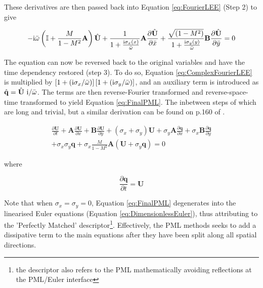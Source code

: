 These derivatives are then passed back into Equation \ref{eq:FourierLEE} (Step 2) to give

\begin{equation} \label{eq:ComplexFourierLEE}
    -\mathrm{i} \Bar{\omega} \left( \mathbb{I} + \frac{M}{1-M^2} \mathbf{A} \right) \hat{\mathbf{U}} + \frac{1}{1 + \frac{\mathrm{i} \sigma_x \left( x \right)}{\Bar{\omega}}} \mathbf{A} \frac{\partial \hat{\mathbf{U}}}{\partial \Bar{x}} + \frac{\sqrt{\left(1-M^2\right)}}{1 + \frac{\mathrm{i} \sigma_y \left( y \right)}{\Bar{\omega}}} \mathbf{B} \frac{\partial \hat{\mathbf{U}}}{\partial \Bar{y}} = 0
\end{equation}

The equation can now be reversed back to the original variables and have the time dependency restored (step 3). To do so, Equation \ref{eq:ComplexFourierLEE} is multiplied by $\left[1+\left(\mathrm{i}\sigma_x / \Bar{\omega} \right) \right]\left[1+\left(\mathrm{i}\sigma_y / \Bar{\omega} \right) \right]$, and an auxiliary term is introduced as $\hat{\mathbf{q}}= \hat{\mathbf{U}} \ \mathrm{i} / \Bar{\omega}$. The terms are then reverse-Fourier transformed and reverse-space-time transformed to yield Equation \ref{eq:FinalPML}. The inbetween steps of which are long and trivial, but a similar derivation can be found on p.160 of \cite{tam2012computational}.


\begin{equation} \label{eq:FinalPML}
\begin{split}
    \frac{\partial \mathbf{U}}{\partial t} + \mathbf{A} \frac{\partial \mathbf{U}}{\partial x} + \mathbf{B} \frac{\partial \mathbf{U}}{\partial y} + \left( \sigma_{x} + \sigma_{y} \right) \mathbf{U} + \sigma_{y} \mathbf{A} \frac{\partial \mathbf{q}}{\partial x} + \sigma_{x} \mathbf{B} \frac{\partial \mathbf{q}}{\partial y} \\
    + \sigma_{x}\sigma_{y}\mathbf{q} + \sigma_{x}\frac{M}{1-M^2} \mathbf{A}\left( \mathbf{U} + \sigma_{y} \mathbf{q} \right) = 0
    \end{split}
\end{equation}

where

\begin{equation} \label{eq:FinalPMLAux}
    \frac{\partial \mathbf{q}}{\partial t} = \mathbf{U}
\end{equation}

Note that when $\sigma_x = \sigma_y = 0$, Equation \ref{eq:FinalPML} degenerates into the linearised Euler equations (Equation \ref{eq:DimensionlessEuler}), thus attributing to the 'Perfectly Matched' descriptor\footnote[1]{the descriptor also refers to the PML mathematically avoiding reflections at the PML/Euler interface}. Effectively, the PML methods seeks to add a dissipative term to the main equations after they have been split along all spatial directions.

